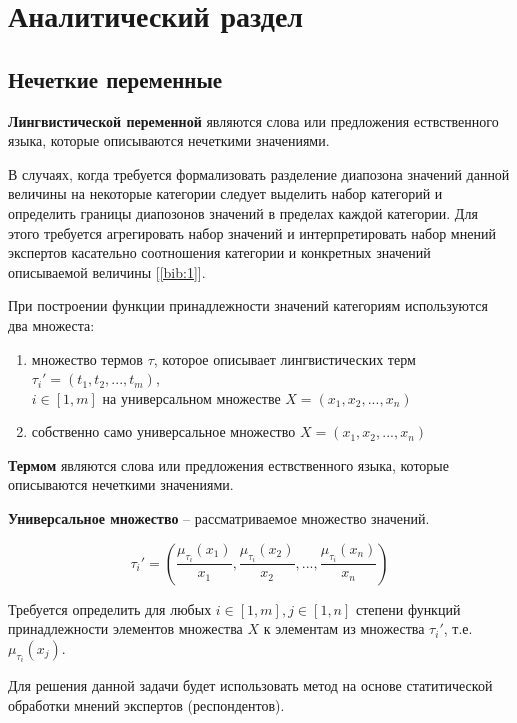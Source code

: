 \chapter{Аналитический раздел}
\label{cha:analytical}

	\section{Нечеткие переменные}

	\par \textbf{Лингвистической переменной} являются слова или предложения ествственного языка, которые описываются нечеткими значениями.

	\par В случаях, когда требуется формализовать разделение диапозона значений данной величины на некоторые категории следует выделить набор категорий и определить границы диапозонов значений в пределах каждой категории. Для этого требуется агрегировать набор значений и интерпретировать набор мнений экспертов касательно соотношения категории и конкретных значений описываемой величины [\ref{bib:1}].
	\par При построении функции принадлежности значений категориям используются два множеста:
	\begin{enumerate}
		\item множество термов $\tau$, которое описывает лингвистических терм $\tau_i' = (t_1, t_2, ..., t_m)$, \\$i \in [1,m]$ на универсальном множестве \begin{math} X = (x_1, x_2, ... ,x_n)\end{math}
		\item собственно само универсальное множество \begin{math} X = (x_1, x_2, ... ,x_n)\end{math}
	\end{enumerate}
	\par \textbf{Термом} являются слова или предложения ествственного языка, которые описываются нечеткими значениями.
	\par \textbf{Универсальное множество} -- рассматриваемое множество значений.

	\begin{equation}
	\tau_i' = \left( \frac{\mu_{\tau_i}(x_1)}{x_1}, \frac{\mu_{\tau_i}(x_2)}{x_2}, ..., \frac{\mu_{\tau_i}(x_n)}{x_n}\right)
	\end{equation}

	\par Требуется определить для любых \begin{math}i \in [1,m], j \in [1,n]\end{math} степени функций принадлежности элементов множества $X$ к элементам из множества \begin{math}\tau_i'\end{math}, т.е. \begin{math} \mu_{\tau_i}(x_j) \end{math}.
	\par Для решения данной задачи будет использовать метод на основе статитической обработки мнений экспертов (респондентов).

